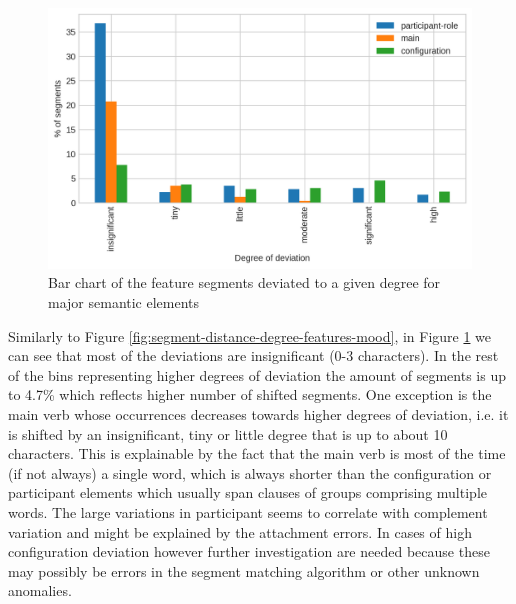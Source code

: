 \begin{figure}[!ht]
    \centering
    \includegraphics[width=.65\textwidth]{evaluation-results/figures/distance-degree-features-semantic}
    \caption{Bar chart of the feature segments deviated to a given degree for major semantic elements}
    \label{fig:segment-distance-degree-features-trans}
\end{figure}

Similarly to Figure \ref{fig:segment-distance-degree-features-mood}, in Figure \ref{fig:segment-distance-degree-features-trans} we can see that most of the deviations are insignificant (0-3 characters). In the rest of the bins representing higher degrees of deviation the amount of segments is up to 4.7\% which reflects higher number of shifted segments. One exception is the main verb whose occurrences decreases towards higher degrees of deviation, i.e. it is shifted by an insignificant, tiny or little degree that is up to about 10 characters. This is explainable by the fact that the main verb is most of the time (if not always) a single word, which is always shorter than the configuration or participant elements which usually span clauses of groups comprising multiple words. The large variations in participant seems to correlate with complement variation and might be explained by the attachment errors. In cases of high configuration deviation however further investigation are needed because these may possibly be errors in the segment matching algorithm or other unknown anomalies.

